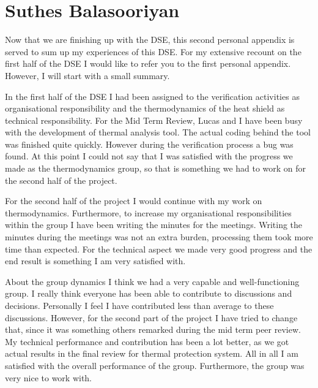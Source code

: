 \section{Suthes Balasooriyan}
Now that we are finishing up with the DSE, this second personal appendix is served to sum up my experiences of this DSE. For my extensive recount on the first half of the DSE I would like to refer you to the first personal appendix. However, I will start with a small summary.

In the first half of the DSE I had been assigned to the verification activities as organisational responsibility and the thermodynamics of the heat shield as technical responsibility. For the Mid Term Review, Lucas and I have been busy with the development of thermal analysis tool. The actual coding behind the tool was finished quite quickly. However during the verification process a bug was found. At this point I could not say that I was satisfied with the progress we made as the thermodynamics group, so that is something we had to work on for the second half of the project.

For the second half of the project I would continue with my work on thermodynamics. Furthermore, to increase my organisational responsibilities within the group I have been writing the minutes for the meetings. Writing the minutes during the meetings was not an extra burden, processing them took more time than expected. For the technical aspect we made very good progress and the end result is something I am very satisfied with. 

About the group dynamics I think we had a very capable and well-functioning group. I really think everyone has been able to contribute to discussions and decisions. Personally I feel I have contributed less than average to these discussions. However, for the second part of the project I have tried to change that, since it was something others remarked during the mid term peer review. My technical performance and contribution has been a lot better, as we got actual results in the final review for thermal protection system. All in all I am satisfied with the overall performance of the group. Furthermore, the group was very nice to work with.